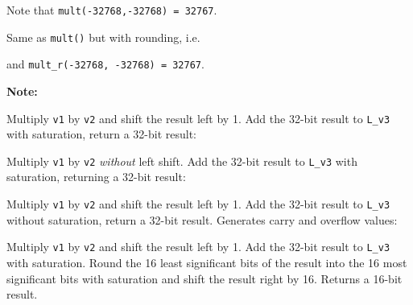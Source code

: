 Note that {\tt mult(-32768,-32768) = 32767}.


Same as {\tt mult()} but with rounding, i.e.


and {\tt mult\_r(-32768, -32768) = 32767}.

\textbf{Note:} \hfill {}


Multiply {\tt v1} by {\tt v2} and shift the result left by 1. Add the
32-bit result to {\tt L\_v3} with saturation, return a 32-bit result:



Multiply {\tt v1} by {\tt v2} {\em without} left shift. Add the 32-bit
result to {\tt L\_v3} with saturation, returning a 32-bit result:



Multiply {\tt v1} by {\tt v2} and shift the result left by 1. Add the
32-bit result to {\tt L\_v3} without saturation, return a 32-bit
result. Generates carry and overflow values:



Multiply {\tt v1} by {\tt v2} and shift the result left by 1. Add
the 32-bit result to {\tt L\_v3} with saturation. Round the 16
least significant bits of the result into the 16 most significant
bits with saturation and shift the result right by 16. Returns a
16-bit result.


